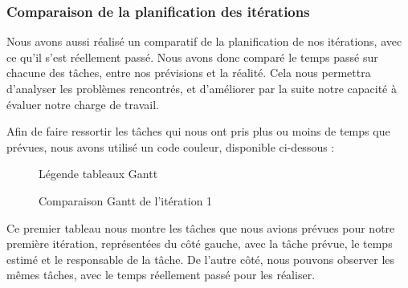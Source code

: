 \documentclass[12pt,titlepage,french]{article}
\begin{document}
\subsubsection{Comparaison de la planification des itérations}

Nous avons aussi réalisé un comparatif de la planification de nos itérations, avec ce qu'il s'est réellement passé. Nous avons donc comparé le temps passé sur chacune des tâches, entre nos prévisions et la réalité. Cela nous permettra d'analyser les problèmes rencontrés, et d'améliorer par la suite notre capacité à évaluer notre charge de travail. \newline

Afin de faire ressortir les tâches qui nous ont pris plus ou moins de temps que prévues, nous avons utilisé un code couleur, disponible ci-dessous :

\begin{figure}[H]
    \caption{\label{} Légende tableaux Gantt}
\end{figure}


\begin{figure}[H]
    \caption{\label{} Comparaison Gantt de l'itération 1}
\end{figure}

Ce premier tableau nous montre les tâches que nous avions prévues pour notre première itération, représentées du côté gauche, avec la tâche prévue, le temps estimé et le responsable de la tâche. De l'autre côté, nous pouvons observer les mêmes tâches, avec le temps réellement passé pour les réaliser. \newline
\end{document}
